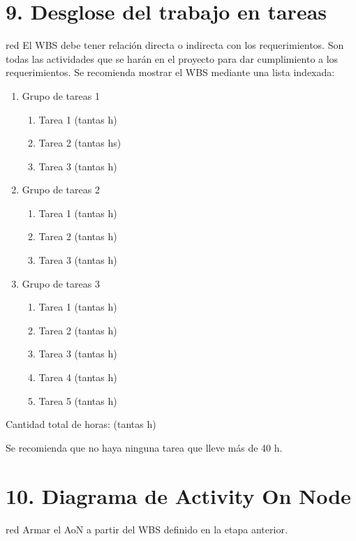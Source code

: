 \documentclass[
11pt, %
]{charter}
\begin{document}
\section{9. Desglose del trabajo en tareas}
\label{sec:wbs}

\begin{consigna}{red}
El WBS debe tener relación directa o indirecta con los requerimientos.  Son todas las actividades que se harán en el proyecto para dar cumplimiento a los requerimientos. Se recomienda mostrar el WBS mediante una lista indexada:

\begin{enumerate}
\item Grupo de tareas 1
	\begin{enumerate}
	\item Tarea 1 (tantas h)
	\item Tarea 2 (tantas hs)
	\item Tarea 3 (tantas h)
	\end{enumerate}
\item Grupo de tareas 2
	\begin{enumerate}
	\item Tarea 1 (tantas h)
	\item Tarea 2 (tantas h)
	\item Tarea 3 (tantas h)
	\end{enumerate}
\item Grupo de tareas 3
	\begin{enumerate}
	\item Tarea 1 (tantas h)
	\item Tarea 2 (tantas h)
	\item Tarea 3 (tantas h)
	\item Tarea 4 (tantas h)
	\item Tarea 5 (tantas h)
	\end{enumerate}
\end{enumerate}

Cantidad total de horas: (tantas h)

Se recomienda que no haya ninguna tarea que lleve más de 40 h. 

\end{consigna}

\section{10. Diagrama de Activity On Node}
\label{sec:AoN}

\begin{consigna}{red}
Armar el AoN a partir del WBS definido en la etapa anterior. 



\end{consigna}
\end{document}
